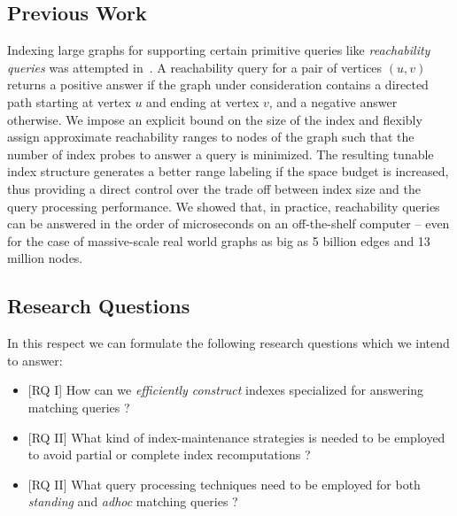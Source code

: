 \documentclass{scrartcl}
\begin{document}
\subsection{Previous Work}
Indexing large graphs for supporting certain primitive queries like \emph{reachability queries} was attempted in~\cite{seufert2013ferrari}. A reachability query for a pair of vertices $(u,v)$ returns a positive answer if the graph under consideration contains a directed path starting at vertex $u$ and ending at vertex $v$, and a negative answer otherwise. We impose an explicit bound on the size of the index and flexibly assign approximate reachability ranges to nodes of the graph such that the number of index probes to answer a query is minimized. The resulting tunable index structure generates a better range labeling if the space budget is increased, thus providing a direct control over the trade off between index size and the query processing performance. We showed that, in practice, reachability queries can be answered in the order of microseconds on an off-the-shelf computer – even for the case of massive-scale real world graphs as big as 5 billion edges and 13 million nodes.


\subsection{Research Questions} 	
In this respect we can formulate the following research questions which we intend to answer:
\begin{itemize}
	\item \textsf{[RQ I]} How can we \emph{efficiently construct} indexes specialized for answering matching queries ? 

	\item \textsf{[RQ II]} What kind of index-maintenance strategies is needed to be employed to avoid partial or complete index recomputations ?

	\item \textsf{[RQ II]} What query processing techniques need to be employed for both \emph{standing} and \emph{adhoc} matching queries ?

\end{itemize}
\end{document}
